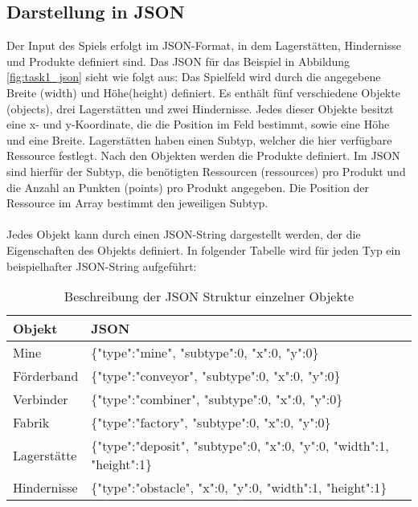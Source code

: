 \subsection{Darstellung in JSON}
Der Input des Spiels erfolgt im JSON-Format, in dem Lagerstätten, Hindernisse und Produkte definiert sind. Das JSON für das Beispiel in Abbildung \ref{fig:task1_json} sieht wie folgt aus:
Das Spielfeld wird durch die angegebene Breite (width) und Höhe(height) definiert. Es enthält fünf verschiedene Objekte (objects), drei Lagerstätten und zwei Hindernisse. Jedes dieser Objekte besitzt eine x- und y-Koordinate, die die Position im Feld bestimmt, sowie eine Höhe und eine Breite. Lagerstätten haben einen Subtyp, welcher die hier verfügbare Ressource festlegt. Nach den Objekten werden die Produkte definiert. Im JSON sind hierfür der Subtyp, die benötigten Ressourcen (ressources) pro Produkt und die Anzahl an Punkten (points) pro Produkt angegeben. Die Position der Ressource im Array bestimmt den jeweiligen Subtyp.
\\\\
Jedes Objekt kann durch einen JSON-String dargestellt werden, der die Eigenschaften des Objekts definiert. In folgender Tabelle wird für jeden Typ ein beispielhafter JSON-String aufgeführt:

\begin{table}
	\begin{center}
		\begin{tabular}{ | l | l | } 
			\hline
			\textbf{Objekt}& \textbf{JSON}\\  \hline
			Mine & \{"type":"mine", "subtype":0, "x":0, "y":0\}\\ \hline
			Förderband & \{"type":"conveyor", "subtype":0, "x":0, "y":0\} \\ \hline
			Verbinder & \{"type":"combiner", "subtype":0, "x":0, "y":0\} \\ \hline
			Fabrik & \{"type":"factory", "subtype":0, "x":0, "y":0\}\\ \hline
			Lagerstätte & \{"type":"deposit", "subtype":0, "x":0, "y":0, "width":1, "height":1\}  \\ \hline
			Hindernisse & \{"type":"obstacle", "x":0, "y":0, "width":1, "height":1\}\\\hline
		\end{tabular}
		\caption{Beschreibung der JSON Struktur einzelner Objekte }
	\end{center}
\end{table}



